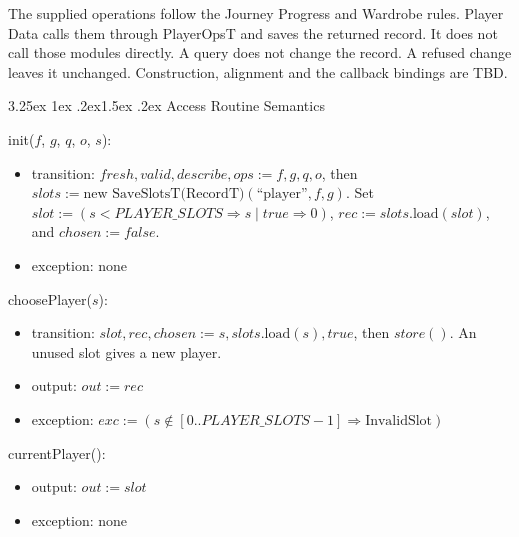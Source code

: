\documentclass[10pt, titlepage]{article}
\makeatletter
\renewcommand\paragraph{\@startsection{paragraph}{4}{\z@}%
  {3.25ex \@plus 1ex \@minus .2ex}{1.5ex \@plus .2ex}%
  {\normalfont\normalsize\bfseries}}
\newcommand{\T}[1]{\mathit{#1}}          %
\newcommand{\out}{\mathit{out}}
\newcommand{\exc}{\mathit{exc}}
\newcommand{\true}{\mathit{true}}
\newcommand{\false}{\mathit{false}}
\makeatother
\begin{document}
The supplied operations follow the Journey Progress and Wardrobe rules.
Player Data calls them through PlayerOpsT and saves the returned record.
It does not call those modules directly. A query does not change the
record. A refused change leaves it unchanged. Construction, alignment and
the callback bindings are TBD.

\paragraph{Access Routine Semantics}

\begin{samepage}
\noindent init($f$, $g$, $q$, $o$, $s$):
\begin{itemize}
\item transition: $\T{fresh}, \T{valid}, \T{describe}, \T{ops} := f, g, q, o$,
  then $\T{slots} := \text{new SaveSlotsT(RecordT)}(\text{``player''}, f, g)$.
  Set $\T{slot} := (s < \T{PLAYER\_SLOTS} \Rightarrow s \mid
  \true \Rightarrow 0)$, $\T{rec} := \T{slots}.\text{load}(\T{slot})$,
  and $\T{chosen} := \false$.
\item exception: none
\end{itemize}
\end{samepage}
\par\pagebreak[0]

\begin{samepage}
\noindent choosePlayer($s$):
\begin{itemize}
\item transition: $\T{slot}, \T{rec}, \T{chosen} := s,
  \T{slots}.\text{load}(s), \true$, then $\T{store}()$. An unused slot gives
  a new player.
\item output: $\out := \T{rec}$
\item exception: $\exc := (s \notin [0..\T{PLAYER\_SLOTS}-1]
  \Rightarrow \text{InvalidSlot})$
\end{itemize}
\end{samepage}
\par\pagebreak[0]

\begin{samepage}
\noindent currentPlayer():
\begin{itemize}
\item output: $\out := \T{slot}$
\item exception: none
\end{itemize}
\end{samepage}
\par\pagebreak[0]
\end{document}

